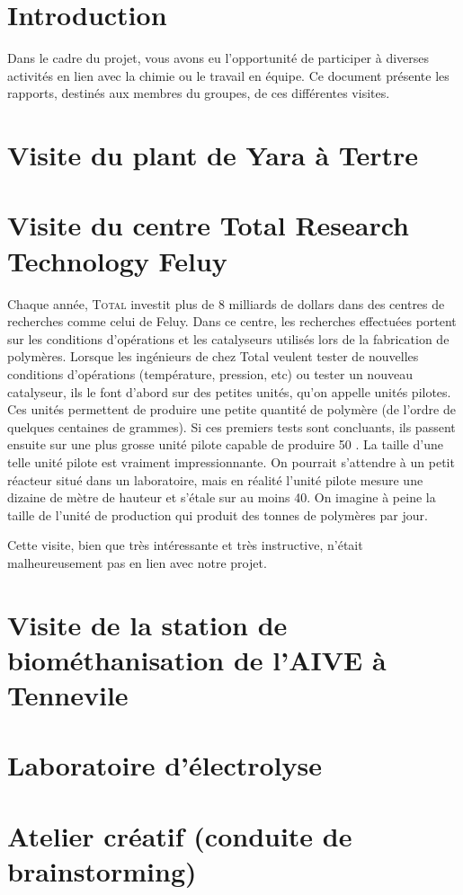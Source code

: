 

\section{Introduction}
Dans le cadre du projet, vous avons eu l'opportunité de 
participer à diverses activités en lien avec la chimie ou
le travail en équipe. Ce document présente les rapports, 
destinés aux membres du groupes, de ces différentes visites.

\section{Visite du plant de Yara à Tertre}

\section{Visite du centre Total Research Technology Feluy}
Chaque année, \textsc{Total} investit plus de 8 milliards de
dollars dans des centres de recherches comme celui de Feluy.
Dans ce centre, les recherches effectuées portent sur les
conditions d'opérations et les catalyseurs utilisés lors de 
la fabrication de polymères. Lorsque les ingénieurs de chez
Total veulent tester de nouvelles conditions d'opérations
(température, pression, etc) ou tester un nouveau catalyseur,
ils le font d'abord sur des petites unités, qu'on appelle unités
pilotes. Ces unités permettent de produire une petite quantité
de polymère (de l'ordre de quelques centaines de grammes). Si
ces premiers tests sont concluants, ils passent ensuite sur une
plus grosse unité pilote capable de produire \unit{50}{\kilo\gram
\per\dday}. La taille d'une telle unité pilote est vraiment
impressionnante. On pourrait s'attendre à un petit réacteur situé
dans un laboratoire, mais en réalité l'unité pilote mesure une dizaine
de mètre de hauteur et s'étale sur au moins \unit{40}{\meter\squared}.
On imagine à peine la taille de l'unité de production qui produit
des tonnes de polymères par jour.

Cette visite, bien que très intéressante et très instructive, n'était
malheureusement pas en lien avec notre projet.

\section{Visite de la station de biométhanisation de l'AIVE à Tennevile}

\section{Laboratoire d'électrolyse}

\section{Atelier créatif (conduite de brainstorming)}
